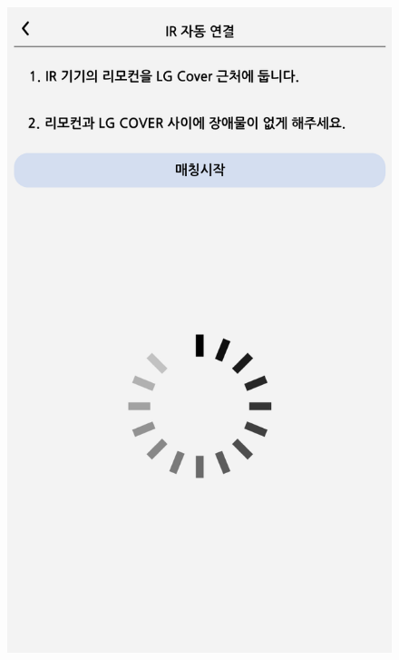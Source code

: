 \documentclass[conference]{IEEEtran}
\begin{document}
\begin{enumerate}[label=\arabic*.]
\begin{enumerate}[label=\alph*.]
\begin{itemize}
\begin{figure}[H]\centering \includegraphics[scale=0.4]{images/sw-spec-15.png}\end{figure}

\end{itemize}
\end{enumerate}
\end{enumerate}
\end{document}
